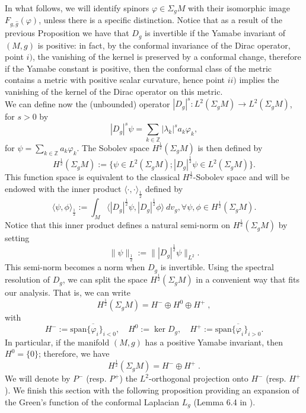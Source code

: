 \documentclass[11pt]{article}
\def \Z {\mathbb{Z}}
\begin{document}
{\noindent
In what follows, we will identify spinors $\varphi \in \Sigma_{g}M$ with their isomorphic image $F_{g,\hat{g}}(\varphi)$, unless there is a specific distinction. Notice that as a result of the previous Proposition we have that $D_{g}$ is invertible if the Yamabe invariant of $(M,g)$ is positive: in fact, by the conformal invariance of the Dirac operator, point $i)$, the vanishing of the kernel is preserved by a conformal change, therefore if the Yamabe constant is positive, then
the conformal class of the metric contains a metric with positive scalar curvature, hence point $ii)$ implies the vanishing of the kernel of the Dirac operator on this metric.\\ 
We can define now the (unbounded) operator $|D_{g}|^{s}:L^{2}(\Sigma_{g}M)\to L^{2}(\Sigma_{g}M)$, for $s>0$ by $$|D_{g}|^{s}\psi =\sum_{k\in \Z} |\lambda_{k}|^{s}a_{k}\varphi_{k},$$
for $\psi=\sum_{k\in \Z}a_{k}\varphi_{k}$. The Sobolev space $H^{\frac{1}{2}}(\Sigma_{g} M)$ is then defined by
$$H^{\frac{1}{2}}(\Sigma_{g} M):=\{\psi \in L^{2}(\Sigma_{g} M); |D_{g}|^{\frac{1}{2}}\psi \in L^{2}(\Sigma_{g} M)\}.$$
This function space is equivalent to the classical $H^{\frac{1}{2}}$-Sobolev space and will be endowed with the inner product $\langle \cdot, \cdot \rangle_{\frac{1}{2}}$ defined by
$$\langle \psi,\phi \rangle_{\frac{1}{2}}:=\int_{M}\langle |D_{g}|^{\frac{1}{2}}\psi,|D_{g}|^{\frac{1}{2}}\phi \rangle \ dv_{g}, \forall \psi, \phi \in H^{\frac{1}{2}}(\Sigma_{g} M).$$
Notice that this inner product defines a natural semi-norm on $H^{\frac{1}{2}}(\Sigma_{g} M)$ by setting
$$\|\psi \|_{\frac{1}{2}}:=\||D_{g}|^{\frac{1}{2}}\psi\|_{L^{2}}.$$
This semi-norm becomes a norm when $D_{g}$ is invertible. Using the spectral resolution of $D_{g}$, we can split the space $H^{\frac{1}{2}}(\Sigma_{g} M)$ in a convenient way that fits our analysis. That is, we can write 
\begin{equation}\label{split}
H^{\frac{1}{2}}(\Sigma_{g} M)=H^{-}\oplus H^{0}\oplus H^{+} \; ,
\end{equation}
with
$$H^{-}:=\overline{\text{span}\{\varphi_i\}_{i<0}},\quad
H^{0}:=\ker D_{g}, \quad
H^{+}:=\overline{\text{span}\{\varphi_i\}_{i>0}}.$$
In particular, if the manifold $(M,g)$ has a positive Yamabe invariant, then $H^{0}=\{0\}$; therefore, we have
$$H^{\frac{1}{2}}(\Sigma_{g} M)=H^{-}\oplus H^{+} \; .$$
We will denote by $P^{-}$ (resp. $P^{+}$) the $L^{2}$-orthogonal projection onto $H^{-}$ (resp. $H^{+}$). We finish this section with the following proposition providing an expansion of the Green's function of the conformal Laplacian $L_{g}$ (Lemma 6.4 in \cite{LP}).


}
\end{document}
